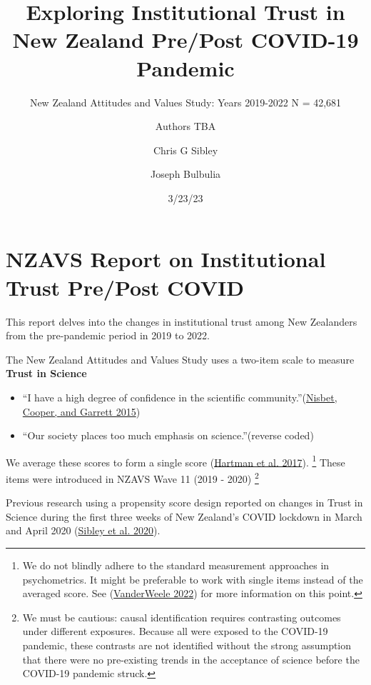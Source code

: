 \documentclass[
  singlecolumn]{report}
\title{Exploring Institutional Trust in New Zealand Pre/Post COVID-19
Pandemic}
\subtitle{New Zealand Attitudes and Values Study: Years 2019-2022 N =
42,681}
\author{Authors TBA \and Chris G Sibley \and Joseph Bulbulia}
\date{3/23/23}
\begin{document}
\maketitle
\ifdefined\Shaded\renewenvironment{Shaded}{\begin{tcolorbox}[breakable, frame hidden, boxrule=0pt, enhanced, interior hidden, sharp corners, borderline west={3pt}{0pt}{shadecolor}]}{\end{tcolorbox}}\fi

\listoffigures
\listoftables
\hypertarget{nzavs-report-on-institutional-trust-prepost-covid}{%
\section{NZAVS Report on Institutional Trust Pre/Post
COVID}\label{nzavs-report-on-institutional-trust-prepost-covid}}

This report delves into the changes in institutional trust among New
Zealanders from the pre-pandemic period in 2019 to 2022.

The New Zealand Attitudes and Values Study uses a two-item scale to
measure \textbf{Trust in Science}

\begin{itemize}
\item
  ``I have a high degree of confidence in the scientific
  community.''(\protect\hyperlink{ref-nisbet2015}{Nisbet, Cooper, and
  Garrett 2015})
\item
  ``Our society places too much emphasis on science.''(reverse coded)
\end{itemize}

We average these scores to form a single score
(\protect\hyperlink{ref-hartman2017}{Hartman et al. 2017}). \footnote{We
  do not blindly adhere to the standard measurement approaches in
  psychometrics. It might be preferable to work with single items
  instead of the averaged score. See
  (\protect\hyperlink{ref-vanderweele2022}{VanderWeele 2022}) for more
  information on this point.} These items were introduced in NZAVS Wave
11 (2019 - 2020) \footnote{We must be cautious: causal identification
  requires contrasting outcomes under different exposures. Because all
  were exposed to the COVID-19 pandemic, these contrasts are not
  identified without the strong assumption that there were no
  pre-existing trends in the acceptance of science before the COVID-19
  pandemic struck.}

Previous research using a propensity score design reported on changes in
Trust in Science during the first three weeks of New Zealand's COVID
lockdown in March and April 2020
(\protect\hyperlink{ref-sibley2020}{Sibley et al. 2020}).
\end{document}
